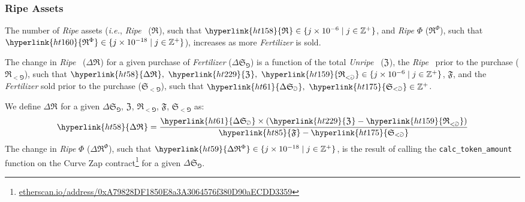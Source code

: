\documentclass[tikz]{article}
\newcommand{\code}[1]{\texttt{#1}}
\newcommand{\term}[1]{\textsl{#1}}
\newcommand{\fref}[1]{\footnote{\href{http://#1}{#1}}}
\newcommand{\Bean}{} %
\newcommand{\bean}{} %
\begin{document}
\subsubsection{Ripe Assets}
The number of \term{Ripe} assets (\term{i.e.}, \term{Ripe} \Bean\ (\hyperlink{ht158}{$\mathfrak{R}^{\bean}$}), such that $\hyperlink{ht158}{\mathfrak{R}^{\bean}} \in \{j \times 10^{-6} \mid j \in \mathbb{Z}^{+} \}$, and \term{Ripe} \hyperlink{ht187}{$\Phi$} (\hyperlink{ht160}{$\mathfrak{R}^{\Phi}$}), such that $\hyperlink{ht160}{\mathfrak{R}^{\Phi}} \in \{j \times 10^{-18} \mid j \in \mathbb{Z}^{+} \}$), increases as more \term{Fertilizer} is sold.

The change in \term{Ripe} \Bean\ (\hyperlink{ht58}{$\Delta \mathfrak{R}^{\bean}$}) for a given purchase of \term{Fertilizer} (\hyperlink{ht61}{$\Delta \mathfrak{S}_{\Game}$}) is a function of the total \term{Unripe} \Bean\ (\hyperlink{ht229}{$\mathfrak{Z}^{\bean}$}), the \term{Ripe} \Bean\ prior to the purchase (\hyperlink{ht159}{$\mathfrak{R}_{<\Game}^{\bean}$}),  such that $\hyperlink{ht58}{\Delta \mathfrak{R}^{\bean}},\ \hyperlink{ht229}{\mathfrak{Z}^{\bean}},\ \hyperlink{ht159}{\mathfrak{R}_{<\Game}^{\bean}} \in \{j \times 10^{-6} \mid j \in \mathbb{Z}^{+} \}$, \hyperlink{ht85}{$\mathfrak{F}$}, and the \term{Fertilizer} sold prior to the purchase (\hyperlink{ht175}{$\mathfrak{S}_{<\Game}$}),  such that $\hyperlink{ht61}{\Delta \mathfrak{S}_{\Game}},\ \hyperlink{ht175}{\mathfrak{S}_{<\Game}} \in \mathbb{Z}^{+}$.

We define \hyperlink{ht58}{$\Delta \mathfrak{R}^{\bean}$} for a given \hyperlink{ht61}{$\Delta \mathfrak{S}_{\Game}$}, \hyperlink{ht229}{$\mathfrak{Z}^{\bean}$}, \hyperlink{ht159}{$\mathfrak{R}_{<\Game}^{\bean}$}, \hyperlink{ht85}{$\mathfrak{F}$}, \hyperlink{ht175}{$\mathfrak{S}_{<\Game}$} as:
$$\hyperlink{ht58}{\Delta \mathfrak{R}^{\bean}} = \frac{\hyperlink{ht61}{\Delta \mathfrak{S}_{\Game}} \times (\hyperlink{ht229}{\mathfrak{Z}^{\bean}} - \hyperlink{ht159}{\mathfrak{R}_{<\Game}^{\bean}})}{\hyperlink{ht85}{\mathfrak{F}} - \hyperlink{ht175}{\mathfrak{S}_{<\Game}}}$$
The change in \term{Ripe} \hyperlink{ht187}{$\Phi$} (\hyperlink{ht59}{$\Delta \mathfrak{R}^{\Phi}$}), such that $\hyperlink{ht59}{\Delta \mathfrak{R}^{\Phi}} \in \{j \times 10^{-18} \mid j \in \mathbb{Z}^{+} \}$, is the result of calling the \code{calc\_token\_amount} function on the Curve Zap contract\fref{etherscan.io/address/0xA79828DF1850E8a3A3064576f380D90aECDD3359} for a given \hyperlink{ht61}{$\Delta \mathfrak{S}_{\Game}$}.
\end{document}
